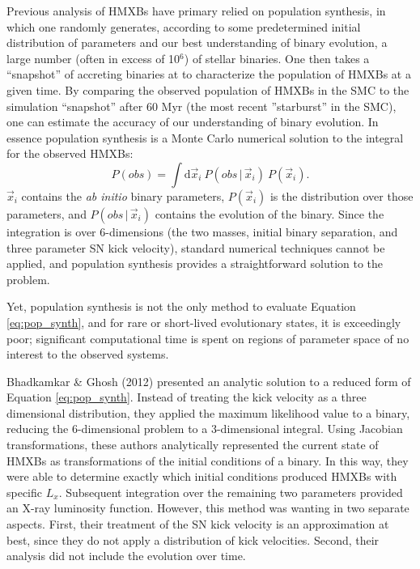 \documentclass[12pt, preprint]{aastex}
\newcommand{\given}{\,|\,}
\newcommand{\dd}{\mathrm{d}}
\begin{document}
Previous analysis of HMXBs have primary relied on population synthesis, in which one randomly generates, according to some predetermined initial distribution of parameters and our best understanding of binary evolution, a large number (often in excess of 10$^6$) of stellar binaries. One then takes a ``snapshot'' of accreting binaries at to characterize the population of HMXBs at a given time. By comparing the observed population of HMXBs in the SMC to the simulation ``snapshot'' after 60 Myr (the most recent ''starburst'' in the SMC), one can estimate the accuracy of our understanding of binary evolution. In essence population synthesis is a Monte Carlo numerical solution to the integral for the observed HMXBs:
\begin{equation}
P(obs) = \int \dd \vec{x}_i\ P(obs \given \vec{x}_i)\ P(\vec{x}_i). \label{eq:pop_synth}
\end{equation}
$\vec{x}_i$ contains the {\it ab initio} binary parameters, $P(\vec{x}_i)$ is the distribution over those parameters, and $P(obs \given \vec{x}_i)$ contains the evolution of the binary. Since the integration is over 6-dimensions (the two masses, initial binary separation, and three parameter SN kick velocity), standard numerical techniques cannot be applied, and population synthesis provides a straightforward solution to the problem. 

Yet, population synthesis is not the only method to evaluate Equation \ref{eq:pop_synth}, and for rare or short-lived evolutionary states, it is exceedingly poor; significant computational time is spent on regions of parameter space of no interest to the observed systems. 

Bhadkamkar \& Ghosh (2012) presented an analytic solution to a reduced form of Equation \ref{eq:pop_synth}. Instead of treating the kick velocity as a three dimensional distribution, they applied the maximum likelihood value to a binary, reducing the 6-dimensional problem to a 3-dimensional integral. Using Jacobian transformations, these authors analytically represented the current state of HMXBs as transformations of the initial conditions of a binary. In this way, they were able to determine exactly which initial conditions produced HMXBs with specific $L_x$. Subsequent integration over the remaining two parameters provided an X-ray luminosity function. However, this method was wanting in two separate aspects. First, their treatment of the SN kick velocity is an approximation at best, since they do not apply a distribution of kick velocities. Second, their analysis did not include the evolution over time. 
\end{document}
